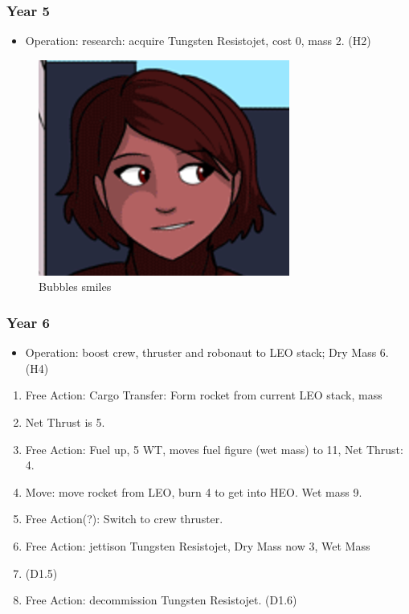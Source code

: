 \documentclass[]{article}
\providecommand{\tightlist}{%
  \setlength{\itemsep}{0pt}\setlength{\parskip}{0pt}}
\begin{document}
\subsubsection{Year 5}\label{year-5}

\begin{itemize}
\tightlist
\item
  Operation: research: acquire Tungsten Resistojet, cost 0, mass 2. (H2)
\end{itemize}

\begin{figure}
\centering
\includegraphics{images/bubbles-smiles.png}
\caption{Bubbles smiles}
\end{figure}

\subsubsection{Year 6}\label{year-6}

\begin{itemize}
\tightlist
\item
  Operation: boost crew, thruster and robonaut to LEO stack; Dry Mass 6.
  (H4)
\end{itemize}

\begin{enumerate}
\def\labelenumi{\arabic{enumi}.}
\item
  Free Action: Cargo Transfer: Form rocket from current LEO stack, mass
\item
  Net Thrust is 5.
\item
  Free Action: Fuel up, 5 WT, moves fuel figure (wet mass) to 11, Net
  Thrust: 4.
\item
  Move: move rocket from LEO, burn 4 to get into HEO. Wet mass 9.
\item
  Free Action(?): Switch to crew thruster.
\item
  Free Action: jettison Tungsten Resistojet, Dry Mass now 3, Wet Mass
\item
  (D1.5)
\item
  Free Action: decommission Tungsten Resistojet. (D1.6)
\end{enumerate}
\end{document}
